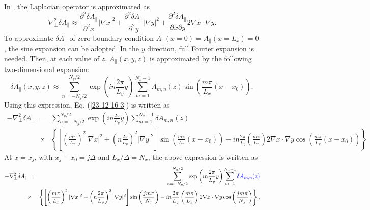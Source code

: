 \documentclass{llncs}
\newcommand{\nosymbol}{}
\newcommand{\tmcolor}[2]{{\color{#1}{#2}}}
\newcommand{\tmtexttt}[1]{\text{{\ttfamily{#1}}}}
\begin{document}
In \tmtexttt{TEK}, the Laplacian operator is approximated as
\begin{equation}
  \label{23-12-16-3} \nabla_{\perp}^2 \delta A_{\parallel} \approx
  \frac{\partial^2 \delta A_{\parallel}}{\partial^2 x}  | \nabla x|^2 +
  \frac{\partial^2 \delta A_{\parallel}}{\partial^2 y}  | \nabla y|^2 +
  \frac{\partial^2 \delta A_{\parallel}}{\partial^{\nosymbol} x \partial y} 2
  \nabla x \cdot \nabla y.
\end{equation}
To approximate $\delta A_{\parallel}$ of zero boundary condition
$A_{\parallel} (x = 0) = A_{\parallel}  (x = L_x) = 0$, the sine expansion can
be adopted. In the $y$ direction, full Fourier expansion is needed. Then, at
each value of $z$, $A_{\parallel} (x, y, z)$ is approximated by the following
two-dimensional expansion:
\begin{equation}
  \delta A_{\parallel} (x, y, z) \approx \sum_{n = - N_y / 2}^{N_y / 2} \exp
  \left( i n \frac{2 \pi}{L_y} y \right) \sum_{m = 1}^{N_x - 1} A_{m, n} (z)
  \sin \left( \frac{m \pi}{L_x} (x - x_0) \right),
\end{equation}
Using this expression, Eq. (\ref{23-12-16-3}) is written as
\begin{eqnarray*}
  - \nabla_{\perp}^2 \delta A_{\parallel} & = & \sum_{n = - N_y / 2}^{N_y / 2}
  \exp \left( i n \frac{2 \pi}{L_y} y \right) \sum_{m = 1}^{N_x - 1} \delta
  A_{m, n} (z)\\
  & \times & \left\{ \left[ \left( \frac{m \pi}{L_x} \right)^2 | \nabla x|^2
  + \left( n \frac{2 \pi}{L_y} \right)^2 | \nabla y|^2 \right] \sin \left(
  \frac{m \pi}{L_x} (x - x_0) \right) - i n \frac{2 \pi}{L_y} \left( \frac{m
  \pi}{L_x} \right) 2 \nabla x \cdot \nabla y \cos \left( \frac{m \pi}{L_x} (x
  - x_0) \right) \right\}
\end{eqnarray*}
At $x = x_j$, with $x_j - x_0 = j \Delta$ and $L_x / \Delta = N_x$, the above
expression is written as
\begin{eqnarray}
  - \nabla_{\perp}^2 \delta A_{\parallel} & = & \sum_{n = - N_y / 2}^{N_y / 2}
  \exp \left( i n \frac{2 \pi}{L_y} y \right) \sum_{m = 1}^{N_x - 1}
  \tmcolor{blue}{\delta A_{m, n} (z)} \nonumber\\
  & \times & \left\{ \left[ \left( \frac{m \pi}{L_x} \right)^2 | \nabla x|^2
  + \left( n \frac{2 \pi}{L_y} \right)^2 | \nabla y|^2 \right] \sin \left(
  \frac{j m \pi}{N_x} \right) - i n \frac{2 \pi}{L_y} \left( \frac{m \pi}{L_x}
  \right) 2 \nabla x \cdot \nabla y \cos \left( \frac{j m \pi}{N_x} \right)
  \right\},  \label{23-12-16-1}
\end{eqnarray}
\end{document}
